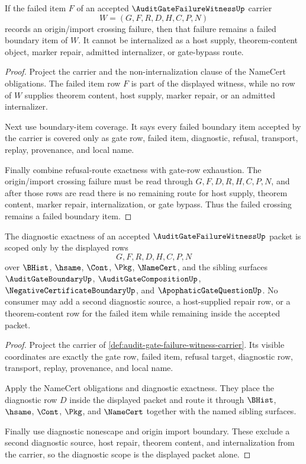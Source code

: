 \begin{theorem}
\label{thm:audit-gate-failure-witness-origin-import-boundary}
If the failed item $F$ of an accepted $\AuditGateFailureWitnessUp$ carrier
$$
W=(G,F,R,D,H,C,P,N)
$$
records an origin/import crossing failure, then that failure remains a failed boundary item of $W$. It cannot be internalized as a host supply, theorem-content object, marker repair, admitted internalizer, or gate-bypass route.
\end{theorem}
\begin{proof}
Project the carrier and the non-internalization clause of the NameCert obligations. The failed item row $F$ is part of the displayed witness, while no row of $W$ supplies theorem content, host supply, marker repair, or an admitted internalizer.

Next use boundary-item coverage. It says every failed boundary item accepted by the carrier is covered only as gate row, failed item, diagnostic, refusal, transport, replay, provenance, and local name.

Finally combine refusal-route exactness with gate-row exhaustion. The origin/import crossing failure must be read through $G,F,D,R,H,C,P,N$, and after those rows are read there is no remaining route for host supply, theorem content, marker repair, internalization, or gate bypass. Thus the failed crossing remains a failed boundary item.
\end{proof}

\begin{theorem}
\label{thm:audit-gate-failure-witness-diagnostic-scope-closure}
The diagnostic exactness of an accepted $\AuditGateFailureWitnessUp$ packet is scoped only by the displayed rows
$$
G,F,R,D,H,C,P,N
$$
over $\BHist$, $\hsame$, $\Cont$, $\Pkg$, $\NameCert$, and the sibling surfaces $\AuditGateBoundaryUp$, $\AuditGateCompositionUp$, $\NegativeCertificateBoundaryUp$, and $\ApophaticGateQuestionUp$. No consumer may add a second diagnostic source, a host-supplied repair row, or a theorem-content row for the failed item while remaining inside the accepted packet.
\end{theorem}
\begin{proof}
Project the carrier of \autoref{def:audit-gate-failure-witness-carrier}. Its visible coordinates are exactly the gate row, failed item, refusal target, diagnostic row, transport, replay, provenance, and local name.

Apply the NameCert obligations and diagnostic exactness. They place the diagnostic row $D$ inside the displayed packet and route it through $\BHist$, $\hsame$, $\Cont$, $\Pkg$, and $\NameCert$ together with the named sibling surfaces.

Finally use diagnostic nonescape and origin import boundary. These exclude a second diagnostic source, host repair, theorem content, and internalization from the carrier, so the diagnostic scope is the displayed packet alone.
\end{proof}

